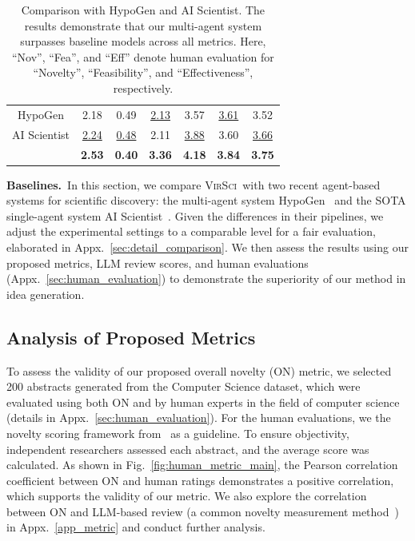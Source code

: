 \documentclass[11pt]{article}
\def\modelname{\textsc{VirSci\xspace}}
\begin{document}
\begin{table}[t]
\begin{threeparttable}
{\begin{tabular}{c|cccccc}
 HypoGen & 2.18 & 0.49 & \underline{2.13} & 3.57 & \underline{3.61} & 3.52 \\
 AI Scientist & \underline{2.24} &  \underline{0.48}  & 2.11 & \underline{3.88} & 3.60 & \underline{3.66}\\
    \cellcolor{gray!15}{\textbf{Ours}} & \cellcolor{gray!15} \textbf{2.53}  &   \cellcolor{gray!15} \textbf{0.40}   & \cellcolor{gray!15} \textbf{3.36}   &   \cellcolor{gray!15} \textbf{4.18}  & \cellcolor{gray!15} \textbf{3.84} & 
    \cellcolor{gray!15} \textbf{3.75} \\
\bottomrule
\end{tabular}}
\end{threeparttable}
\caption{Comparison with HypoGen and AI Scientist. The results demonstrate that our multi-agent system surpasses baseline models across all metrics. Here, ``Nov'', ``Fea'', and ``Eff'' denote human evaluation for ``Novelty'', ``Feasibility'', and ``Effectiveness'', respectively.}
\label{fig:comparisons_w_ai_scientist}
\end{table}

\noindent \textbf{Baselines.}~In this section, we compare \modelname\ with two recent agent-based systems for scientific discovery: the multi-agent system HypoGen~\cite{qi2024large} and the SOTA single-agent system AI Scientist~\cite{lu2024ai}. Given the differences in their pipelines, we adjust the experimental settings to a comparable level for a fair evaluation, elaborated in Appx.~\ref{sec:detail_comparison}. We then assess the results using our proposed metrics, LLM review scores, and human evaluations (Appx.~\ref{sec:human_evaluation}) to demonstrate the superiority of our method in idea generation.

\subsection{Analysis of Proposed Metrics} 
\label{sec:analyze_metrics}
To assess the validity of our proposed overall novelty (ON) metric, we selected 200 abstracts generated from the Computer Science dataset, which were evaluated using both ON and by human experts in the field of computer science (details in Appx.~\ref{sec:human_evaluation}). For the human evaluations, we the novelty scoring framework from~\citep{si2024can} as a guideline. To ensure objectivity, independent researchers assessed each abstract, and the average score was calculated.
As shown in Fig.~\ref{fig:human_metric_main}, the Pearson correlation coefficient between ON and human ratings demonstrates a positive correlation, which supports the validity of our metric. We also explore the correlation between ON and LLM-based review (a common novelty measurement method~\citep{gu2024survey}) in Appx.~\ref{app_metric} and conduct further analysis.
\end{document}
